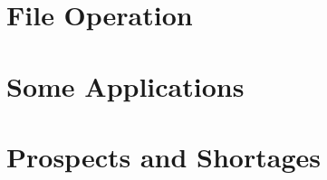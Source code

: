 \documentclass{swfcthesisp}
\begin{document}
\section{File Operation}

\section{Some Applications}

\section{Prospects and Shortages}


\Appendix{}
\printbibliography[heading={bibintoc},title={参考文献}] %
\advisorinfopage{}                 %
\acknowledgmentspage{}             %






\end{document}
